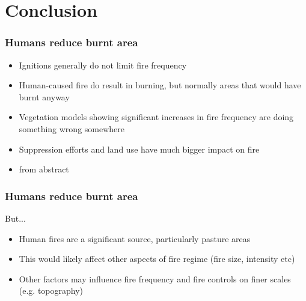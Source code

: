 \section{Conclusion}


\begin{frame}
    \frametitle{Humans reduce burnt area}

	\begin{itemize}
		\item Ignitions generally do not limit fire frequency
		\item Human-caused fire do result in burning, but normally areas that would have burnt anyway
		\item Vegetation models showing significant increases in fire frequency are doing something wrong somewhere
		\item Suppression efforts and land use have much bigger impact on fire
		\item from abstract
	\end{itemize}
\end{frame}
\begin{frame}
    \frametitle{Humans reduce burnt area}
	\large{But...}
	\begin{itemize}
		\item Human fires are a significant source, particularly pasture areas
		\item This would likely affect other aspects of fire regime (fire size, intensity etc)
		\item Other factors may influence fire frequency and fire controls on finer scales (e.g. topography)
	\end{itemize}
\end{frame}
